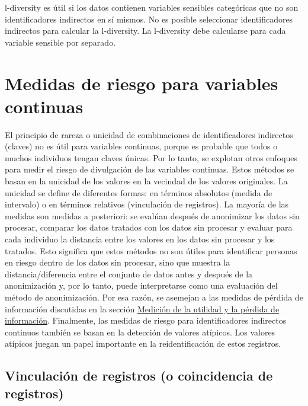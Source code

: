 \documentclass[
]{book}
\theoremstyle{definition}
\theoremstyle{definition}
\theoremstyle{definition}
\theoremstyle{definition}
\theoremstyle{remark}
\begin{document}
l-diversity es útil si los datos contienen variables sensibles categóricas que no son identificadores indirectos en sí mismos. No es posible seleccionar identificadores indirectos para calcular la l-diversity. La l-diversity debe calcularse para cada variable sensible por separado.

\hypertarget{medidas-de-riesgo-para-variables-continuas}{%
\section{Medidas de riesgo para variables continuas}\label{medidas-de-riesgo-para-variables-continuas}}

El principio de rareza o unicidad de combinaciones de identificadores indirectos (claves) no es útil para variables continuas, porque es probable que todos o muchos individuos tengan claves únicas. Por lo tanto, se explotan otros enfoques para medir el riesgo de divulgación de las variables continuas. Estos métodos se basan en la unicidad de los valores en la vecindad de los valores originales. La unicidad se define de diferentes formas: en términos absolutos (medida de intervalo) o en términos relativos (vinculación de registros). La mayoría de las medidas son medidas a posteriori: se evalúan después de anonimizar los datos sin procesar, comparar los datos tratados con los datos sin procesar y evaluar para cada individuo la distancia entre los valores en los datos sin procesar y los tratados. Esto significa que estos métodos no son útiles para identificar personas en riesgo dentro de los datos sin procesar, sino que muestra la distancia/diferencia entre el conjunto de datos antes y después de la anonimización y, por lo tanto, puede interpretarse como una evaluación del método de anonimización. Por esa razón, se asemejan a las medidas de pérdida de información discutidas en la sección \protect\hyperlink{mediciuxf3n-de-la-utilidad-y-la-puxe9rdida-de-informaciuxf3n}{Medición de la utilidad y la pérdida de información}. Finalmente, las medidas de riesgo para identificadores indirectos continuos también se basan en la detección de valores atípicos. Los valores atípicos juegan un papel importante en la reidentificación de estos registros.

\hypertarget{vinculaciuxf3n-de-registros-o-coincidencia-de-registros}{%
\subsection{Vinculación de registros (o coincidencia de registros)}\label{vinculaciuxf3n-de-registros-o-coincidencia-de-registros}}
\end{document}
